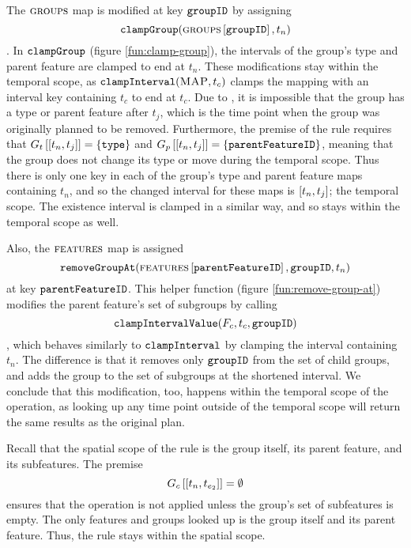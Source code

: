    The $\textsc{groups}{}{}$ map is modified at key $\texttt{groupID}$ by assigning 
   $$\texttt{clampGroup}(\textsc{groups}{} \left[ \texttt{groupID} \right], t_n)$$
   . In $\texttt{clampGroup}$ (figure \vref{fun:clamp-group}), the intervals of the group's type and parent feature are clamped to end at $t_n$. These modifications stay within the temporal scope, as $\texttt{clampInterval}(\textsc{MAP}, t_c)$ clamps the mapping with an interval key containing $t_c$ to end at $t_c$. Due to , it is impossible that the group has a type or parent feature after $t_j$, which is the time point when the group was originally planned to be removed. Furthermore, the premise of the rule requires that $\lookup{G_t}{\interval{t_n}{t_j}} = \set{\var{type}}$ and $\lookup{G_p}{\interval{t_n}{t_j}} = \set{\var{parentFeatureID}}$, meaning that the group does not change its type or move during the temporal scope. Thus there is only one key in each of the group's type and parent feature maps containing $t_n$, and so the changed interval for these maps is $\interval{t_n}{t_j}$; the temporal scope. The existence interval is clamped in a similar way, and so stays within the temporal scope as well.

   Also, the $\textsc{features}{}$ map is assigned $$\texttt{removeGroupAt}(\textsc{features} \left[ \texttt{parentFeatureID} \right], \texttt{groupID}, t_n)$$ at key $\texttt{parentFeatureID}$. This helper function (figure \vref{fun:remove-group-at}) modifies the parent feature's set of subgroups by calling $$\texttt{clampIntervalValue}(F_c, t_c, \texttt{groupID})$$, which behaves similarly to $\texttt{clampInterval}$ by clamping the interval containing $t_n$. The difference is that it removes only $\texttt{groupID}$ from the set of child groups, and adds the group to the set of subgroups at the shortened interval. We conclude that this modification, too, happens within the temporal scope of the operation, as looking up any time point outside of the temporal scope will return the same results as the original plan.

   Recall that the spatial scope of the rule is the group itself, its parent feature, and its subfeatures. The premise
\begin{equation*}
   \lookup{G_c}{\interval{t_n}{t_{e_2}}} = \emptyset
\end{equation*}
   ensures that the operation is not applied unless the group's set of subfeatures is empty. The only features and groups looked up is the group itself and its parent feature. Thus, the rule stays within the spatial scope.
 \\

